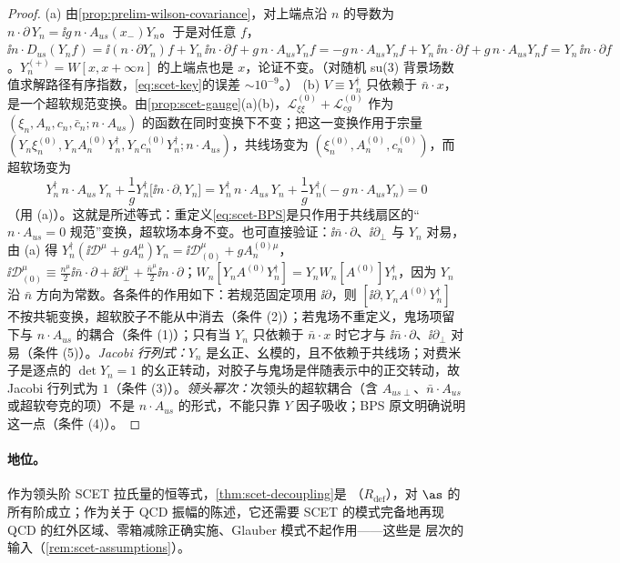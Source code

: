 \begin{proof}
(a) 由\cref{prop:prelim-wilson-covariance}，对上端点沿 $n$ 的导数为 $n\cdot\partial\,Y_n=\ii g\,n\cdot A_{us}(x_-)Y_n$。于是对任意 $f$，
$\ii n\cdot D_{us}(Y_nf)=\ii(n\cdot\partial Y_n)f+Y_n\,\ii n\cdot\partial f+g\,n\cdot A_{us}Y_nf=-g\,n\cdot A_{us}Y_nf+Y_n\,\ii n\cdot\partial f+g\,n\cdot A_{us}Y_nf=Y_n\,\ii n\cdot\partial f$。$Y_n^{(+)}=W[x,x+\infty n]$ 的上端点也是 $x$，论证不变。（对随机 su(3) 背景场数值求解路径有序指数，\cref{eq:scet-key}的误差 $\sim10^{-9}$。）%
(b) $V\equiv Y_n^\dagger$ 只依赖于 $\bar n\cdot x$，是一个超软规范变换。由\cref{prop:scet-gauge}(a)(b)，$\mathcal L^{(0)}_{\xi\xi}+\mathcal L^{(0)}_{cg}$ 作为 $(\xi_n,A_n,c_n,\bar c_n;n\cdot A_{us})$ 的函数在同时变换下不变；把这一变换作用于宗量 $(Y_n\xi^{(0)}_n,Y_nA^{(0)}_nY_n^\dagger,Y_nc^{(0)}_nY_n^\dagger;n\cdot A_{us})$，共线场变为 $(\xi^{(0)}_n,A^{(0)}_n,c^{(0)}_n)$，而超软场变为
\[
Y_n^\dagger\,n\cdot A_{us}\,Y_n+\frac1gY_n^\dagger\big[\ii n\cdot\partial,Y_n\big]=Y_n^\dagger\,n\cdot A_{us}\,Y_n+\frac1gY_n^\dagger\big(-g\,n\cdot A_{us}Y_n\big)=0
\]
（用 (a)）。这就是所述等式：重定义\cref{eq:scet-BPS}是只作用于共线扇区的“$n\cdot A_{us}=0$ 规范”变换，超软场本身不变。也可直接验证：$\ii\bar n\cdot\partial$、$\ii\partial_\perp$ 与 $Y_n$ 对易，由 (a) 得 $Y_n^\dagger(\ii\mathcal D^\mu+gA_n^\mu)Y_n=\ii\mathcal D^\mu_{(0)}+gA_n^{(0)\mu}$，$\ii\mathcal D_{(0)}^\mu\equiv\frac{n^\mu}2\ii\bar n\cdot\partial+\ii\partial_\perp^\mu+\frac{\bar n^\mu}2\ii n\cdot\partial$；$W_n[Y_nA^{(0)}Y_n^\dagger]=Y_nW_n[A^{(0)}]Y_n^\dagger$，因为 $Y_n$ 沿 $\bar n$ 方向为常数。各条件的作用如下：若规范固定项用 $\ii\partial$，则 $[\ii\partial,Y_nA^{(0)}Y_n^\dagger]$ 不按共轭变换，超软胶子不能从中消去（条件 (2)）；若鬼场不重定义，鬼场项留下与 $n\cdot A_{us}$ 的耦合（条件 (1)）；只有当 $Y_n$ 只依赖于 $\bar n\cdot x$ 时它才与 $\ii\bar n\cdot\partial$、$\ii\partial_\perp$ 对易（条件 (5)）。\emph{Jacobi 行列式：}$Y_n$ 是幺正、幺模的，且不依赖于共线场；对费米子是逐点的 $\det Y_n=1$ 的幺正转动，对胶子与鬼场是伴随表示中的正交转动，故 Jacobi 行列式为 $1$（条件 (3)）。\emph{领头幂次：}次领头的超软耦合（含 $A_{us\perp}$、$\bar n\cdot A_{us}$ 或超软夸克的项）不是 $n\cdot A_{us}$ 的形式，不能只靠 $Y$ 因子吸收；BPS 原文明确说明这一点\cite{BauerPirjolStewart2002}（条件 (4)）。
\end{proof}

\paragraph{地位。}作为领头阶 SCET 拉氏量的恒等式，\cref{thm:scet-decoupling}是 \tagR（$R_{\mathrm{def}}$），对 $\as$ 的所有阶成立；作为关于 QCD 振幅的陈述，它还需要 SCET 的模式完备地再现 QCD 的红外区域、零箱减除正确实施、Glauber 模式不起作用——这些是 \tagA 层次的输入（\cref{rem:scet-assumptions}）。

